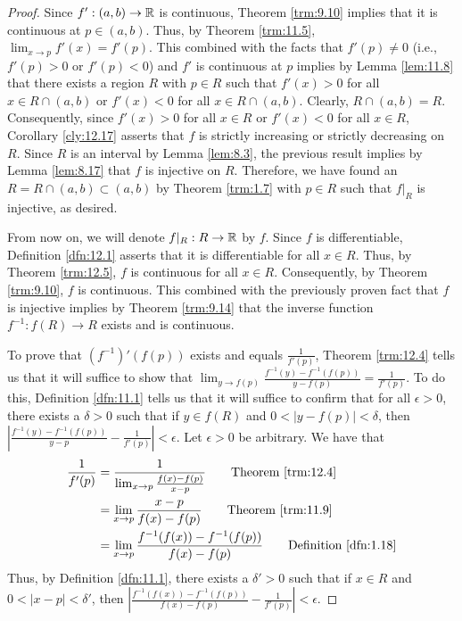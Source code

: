 \documentclass[../main.tex]{subfiles}
\begin{document}
\begin{theorem}
\begin{proof}
        Since $f':(a,b)\to\mathbb{R}$ is continuous, Theorem \ref{trm:9.10} implies that it is continuous at $p\in(a,b)$. Thus, by Theorem \ref{trm:11.5}, $\lim_{x\to p}f'(x)=f'(p)$. This combined with the facts that $f'(p)\neq 0$ (i.e., $f'(p)>0$ or $f'(p)<0$) and $f'$ is continuous at $p$ implies by Lemma \ref{lem:11.8} that there exists a region $R$ with $p\in R$ such that $f'(x)>0$ for all $x\in R\cap(a,b)$ or $f'(x)<0$ for all $x\in R\cap(a,b)$. Clearly, $R\cap(a,b)=R$. Consequently, since $f'(x)>0$ for all $x\in R$ or $f'(x)<0$ for all $x\in R$, Corollary \ref{cly:12.17} asserts that $f$ is strictly increasing or strictly decreasing on $R$. Since $R$ is an interval by Lemma \ref{lem:8.3}, the previous result implies by Lemma \ref{lem:8.17} that $f$ is injective on $R$. Therefore, we have found an $R=R\cap(a,b)\subset(a,b)$ by Theorem \ref{trm:1.7} with $p\in R$ such that $f|_R$ is injective, as desired.\par
        From now on, we will denote $f|_R:R\to\mathbb{R}$ by $f$. Since $f$ is differentiable, Definition \ref{dfn:12.1} asserts that it is differentiable for all $x\in R$. Thus, by Theorem \ref{trm:12.5}, $f$ is continuous for all $x\in R$. Consequently, by Theorem \ref{trm:9.10}, $f$ is continuous. This combined with the previously proven fact that $f$ is injective implies by Theorem \ref{trm:9.14} that the inverse function $f^{-1}:f(R)\to R$ exists and is continuous.\par
        To prove that $(f^{-1})'(f(p))$ exists and equals $\frac{1}{f'(p)}$, Theorem \ref{trm:12.4} tells us that it will suffice to show that $\lim_{y\to f(p)}\frac{f^{-1}(y)-f^{-1}(f(p))}{y-f(p)}=\frac{1}{f'(p)}$. To do this, Definition \ref{dfn:11.1} tells us that it will suffice to confirm that for all $\epsilon>0$, there exists a $\delta>0$ such that if $y\in f(R)$ and $0<|y-f(p)|<\delta$, then $|\frac{f^{-1}(y)-f^{-1}(f(p))}{y-p}-\frac{1}{f'(p)}|<\epsilon$. Let $\epsilon>0$ be arbitrary. We have that
        \begin{align*}
            \frac{1}{f'(p)} &= \frac{1}{\lim_{x\to p}\frac{f(x)-f(p)}{x-p}}\tag*{Theorem \ref{trm:12.4}}\\
            &= \lim_{x\to p}\frac{x-p}{f(x)-f(p)}\tag*{Theorem \ref{trm:11.9}}\\
            &= \lim_{x\to p}\frac{f^{-1}(f(x))-f^{-1}(f(p))}{f(x)-f(p)}\tag*{Definition \ref{dfn:1.18}}
        \end{align*}
        Thus, by Definition \ref{dfn:11.1}, there exists a $\delta'>0$ such that if $x\in R$ and $0<|x-p|<\delta'$, then $|\frac{f^{-1}(f(x))-f^{-1}(f(p))}{f(x)-f(p)}-\frac{1}{f'(p)}|<\epsilon$.\par

\end{proof}
\end{theorem}
\end{document}
